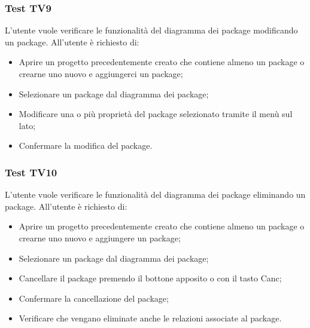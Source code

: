 \documentclass[../PianoDiQualifica.tex]{subfiles}
\begin{document}
	\subsubsection{Test TV9} 
	L'utente vuole verificare le funzionalità del diagramma dei package modificando un package. 
	All'utente è richiesto di: 
	\begin{itemize} 
		\item Aprire un progetto precedentemente creato che contiene almeno un package o crearne uno nuovo e aggiungerci un package; 
		\item Selezionare un package dal diagramma dei package; 
		\item Modificare una o più proprietà del package selezionato tramite il menù sul lato; %
		\item Confermare la modifica del package. 
	\end{itemize} 
	
	\subsubsection{Test TV10} 
	L'utente vuole verificare le funzionalità del diagramma dei package eliminando un package. 
	All'utente è richiesto di: 
	\begin{itemize} 
		\item Aprire un progetto precedentemente creato che contiene almeno un package  o crearne uno nuovo e aggiungere un package; 
		\item Selezionare un package dal diagramma dei package; 
		\item Cancellare il package premendo il bottone apposito o con il tasto Canc; 
		\item Confermare la cancellazione del package; 
		\item Verificare che vengano eliminate anche le relazioni associate al package. 
	\end{itemize}  %
	
	
\end{document}

